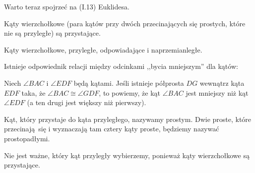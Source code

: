 Warto teraz spojrzeć na (I.13) Euklidesa.

\begin{proposition}
    Kąty wierzchołkowe (para kątów przy dwóch przecinających się prostych, które nie są przyległe) są przystające.
\end{proposition}

Kąty wierzchołkowe, przyległe, odpowiadające i naprzemianległe.

Istnieje odpowiednik relacji między odcinkami ,,bycia mniejszym'' dla kątów:

\begin{definition}
    Niech $\angle BAC$ i $\angle EDF$ będą kątami.
    Jeśli istnieje półprosta $DG$ wewnątrz kąta $EDF$ taka, że $\angle BAC \cong \angle GDF$, to powiemy, że kąt $\angle BAC$ jest mniejszy niż kąt $\angle EDF$ (a ten drugi jest większy niż pierwszy).
\end{definition}

\begin{definition}
    Kąt, który przystaje do kąta przyległego, nazywamy prostym.
    Dwie proste, które przecinają się i wyznaczają tam cztery kąty proste, będziemy nazywać prostopadłymi.
\end{definition}

Nie jest ważne, który kąt przyległy wybierzemy, ponieważ kąty wierzchołkowe są przystające.
